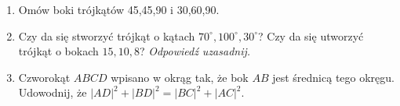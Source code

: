 \documentclass[12pt,a4paper]{article}
\begin{document}
\begin{enumerate}[1.]
	\item Omów boki trójkątów 45,45,90 i 30,60,90.
	
	\item Czy da się stworzyć trójkąt o kątach $70^\circ,100^\circ,30^\circ$?\newline
	Czy da się utworzyć trójkąt o bokach $15,10,8$?\newline
	\textit{Odpowiedź uzasadnij.}
	
	\item Czworokąt $ABCD$ wpisano w okrąg tak, że bok $AB$ jest średnicą tego okręgu. Udowodnij, że $|AD|^2+|BD|^2=|BC|^2+|AC|^2$.
		
	\end{enumerate}
	
\end{document}
